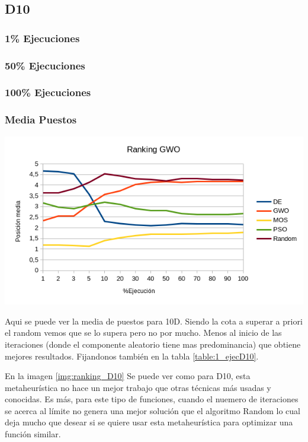\documentclass[a4paper, 12.5pt]{report}
\begin{document}
\subsection{D10}

\subsubsection*{1\% Ejecuciones}

\subsubsection*{50\% Ejecuciones}


\subsubsection*{100\% Ejecuciones}


\subsubsection*{Media Puestos}

\includegraphics*[width=1\textwidth]{Resultados/basico/d10/Grafico_puestos.png} \label{img:ranking_D10}


Aqui se puede ver la media de puestos para 10D. Siendo la cota a superar a priori el random vemos que se lo supera pero no por mucho. Menos al inicio de las iteraciones (donde el componente aleatorio tiene mas predominancia) que obtiene mejores resultados. Fijandonos también en la tabla \ref{table:1_ejecD10}.

En la imagen \ref*{img:ranking_D10} Se puede ver como para D10, esta metaheurística no hace un mejor trabajo que otras técnicas más usadas y conocidas. Es más, para este tipo de funciones, cuando el nuemero de iteraciones se acerca al límite no genera una mejor solución que el algoritmo Random lo cual deja mucho que desear si se quiere usar esta metaheurística para optimizar una función similar.
\end{document}
